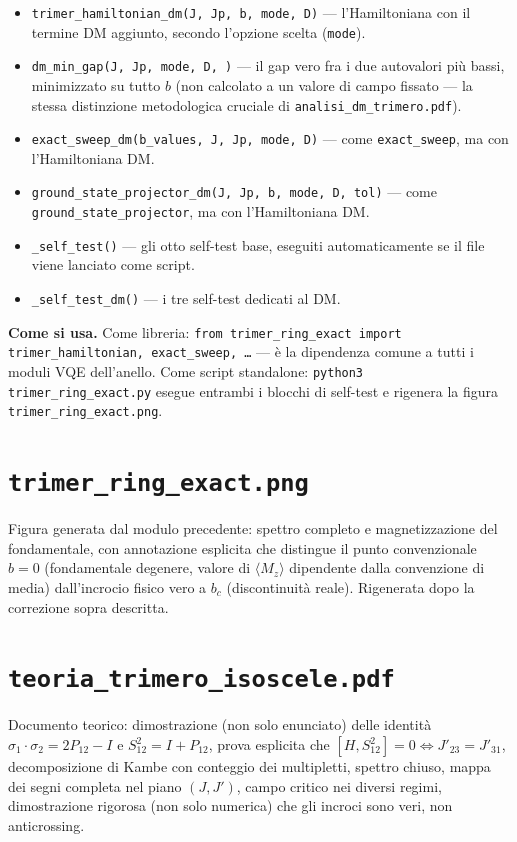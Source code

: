 \documentclass[11pt,a4paper]{article}
\begin{document}
\begin{itemize}
\item \texttt{trimer\_hamiltonian\_dm(J,\ Jp,\ b,\ mode,\ D)} — l'Hamiltoniana con
il termine DM aggiunto, secondo l'opzione scelta (\texttt{mode}).
\item \texttt{dm\_min\_gap(J,\ Jp,\ mode,\ D,\ )} — il
gap vero fra i due autovalori più bassi, minimizzato su tutto $b$ (non calcolato a un
valore di campo fissato — la stessa distinzione metodologica cruciale di
\texttt{analisi\_dm\_trimero.pdf}).
\item \texttt{exact\_sweep\_dm(b\_values,\ J,\ Jp,\ mode,\ D)} — come
\texttt{exact\_sweep}, ma con l'Hamiltoniana DM.
\item \texttt{ground\_state\_projector\_dm(J,\ Jp,\ b,\ mode,\ D,\ tol)} — come
\texttt{ground\_state\_projector}, ma con l'Hamiltoniana DM.
\item \texttt{\_self\_test()} — gli otto self-test base, eseguiti automaticamente se
il file viene lanciato come script.
\item \texttt{\_self\_test\_dm()} — i tre self-test dedicati al DM.
\end{itemize}

\textbf{Come si usa.} Come libreria: \texttt{from trimer\_ring\_exact import
trimer\_hamiltonian, exact\_sweep, \ldots} — è la dipendenza comune a tutti i moduli
VQE dell'anello. Come script standalone: \texttt{python3 trimer\_ring\_exact.py}
esegue entrambi i blocchi di self-test e rigenera la figura
\texttt{trimer\_ring\_exact.png}.

\section*{\texttt{trimer\_ring\_exact.png}}

Figura generata dal modulo precedente: spettro completo e magnetizzazione del
fondamentale, con annotazione esplicita che distingue il punto convenzionale $b=0$
(fondamentale degenere, valore di $\langle M_z\rangle$ dipendente dalla convenzione di
media) dall'incrocio fisico vero a $b_c$ (discontinuità reale). Rigenerata dopo la
correzione sopra descritta.

\section*{\texttt{teoria\_trimero\_isoscele.pdf}}

Documento teorico: dimostrazione (non solo enunciato) delle identità
$\sigma_1\cdot\sigma_2=2P_{12}-I$ e $S_{12}^2=I+P_{12}$, prova esplicita che
$[H,S_{12}^2]=0 \Leftrightarrow J'_{23}=J'_{31}$, decomposizione di Kambe con conteggio
dei multipletti, spettro chiuso, mappa dei segni completa nel piano $(J,J')$, campo
critico nei diversi regimi, dimostrazione rigorosa (non solo numerica) che gli
incroci sono veri, non anticrossing.
\end{document}
